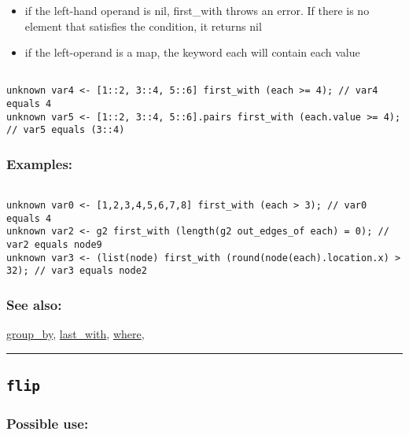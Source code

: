 \documentclass[]{book}
\providecommand{\tightlist}{%
  \setlength{\itemsep}{0pt}\setlength{\parskip}{0pt}}
\theoremstyle{definition}
\theoremstyle{definition}
\theoremstyle{definition}
\theoremstyle{remark}
\begin{document}
\begin{itemize}
\tightlist
\item
  if the left-hand operand is nil, first\_with throws an error. If there
  is no element that satisfies the condition, it returns nil\\
\item
  if the left-operand is a map, the keyword each will contain each value
\end{itemize}

\begin{verbatim}
 
unknown var4 <- [1::2, 3::4, 5::6] first_with (each >= 4); // var4 equals 4 
unknown var5 <- [1::2, 3::4, 5::6].pairs first_with (each.value >= 4); // var5 equals (3::4)
\end{verbatim}

\subsubsection{Examples:}\label{examples-124}

\begin{verbatim}
 
unknown var0 <- [1,2,3,4,5,6,7,8] first_with (each > 3); // var0 equals 4 
unknown var2 <- g2 first_with (length(g2 out_edges_of each) = 0); // var2 equals node9 
unknown var3 <- (list(node) first_with (round(node(each).location.x) > 32); // var3 equals node2
\end{verbatim}

\subsubsection{See also:}\label{see-also-95}

\href{operators-d-to-h.html\#group_by}{group\_by},
\href{operators-i-to-m.html\#last_with}{last\_with},
\href{operators-s-to-z.html\#where}{where},

\begin{center}\rule{0.5\linewidth}{\linethickness}\end{center}

\subsection{\texorpdfstring{\texttt{flip}}{flip}}\label{flip}

\subsubsection{Possible use:}\label{possible-use-169}
\end{document}
